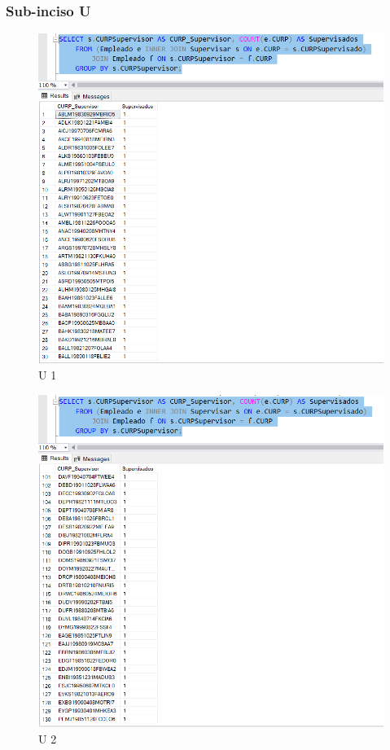 \documentclass[a4paper, 12pt]{report}
\begin{document}
\subsubsection*{Sub-inciso U}
    \begin{figure}
        \includegraphics[width=\textwidth]
            {img/U1.png}\hfill
    \caption{U 1}
    \end{figure}
    \begin{figure}
        \includegraphics[width=\textwidth]
            {img/U2.png}\hfill
    \caption{U 2}
    \end{figure}
\end{document}

